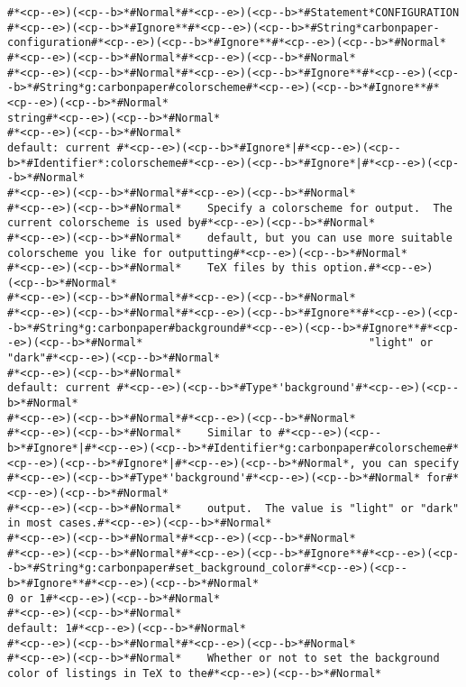 \begin{lstlisting}[style=carbonpaper]
#*<cp--e>)(<cp--b>*#Normal*#*<cp--e>)(<cp--b>*#Statement*CONFIGURATION                                      #*<cp--e>)(<cp--b>*#Ignore**#*<cp--e>)(<cp--b>*#String*carbonpaper-configuration#*<cp--e>)(<cp--b>*#Ignore**#*<cp--e>)(<cp--b>*#Normal*
#*<cp--e>)(<cp--b>*#Normal*#*<cp--e>)(<cp--b>*#Normal*
#*<cp--e>)(<cp--b>*#Normal*#*<cp--e>)(<cp--b>*#Ignore**#*<cp--e>)(<cp--b>*#String*g:carbonpaper#colorscheme#*<cp--e>)(<cp--b>*#Ignore**#*<cp--e>)(<cp--b>*#Normal*                                             string#*<cp--e>)(<cp--b>*#Normal*
#*<cp--e>)(<cp--b>*#Normal*                                               default: current #*<cp--e>)(<cp--b>*#Ignore*|#*<cp--e>)(<cp--b>*#Identifier*:colorscheme#*<cp--e>)(<cp--b>*#Ignore*|#*<cp--e>)(<cp--b>*#Normal*
#*<cp--e>)(<cp--b>*#Normal*#*<cp--e>)(<cp--b>*#Normal*
#*<cp--e>)(<cp--b>*#Normal*    Specify a colorscheme for output.  The current colorscheme is used by#*<cp--e>)(<cp--b>*#Normal*
#*<cp--e>)(<cp--b>*#Normal*    default, but you can use more suitable colorscheme you like for outputting#*<cp--e>)(<cp--b>*#Normal*
#*<cp--e>)(<cp--b>*#Normal*    TeX files by this option.#*<cp--e>)(<cp--b>*#Normal*
#*<cp--e>)(<cp--b>*#Normal*#*<cp--e>)(<cp--b>*#Normal*
#*<cp--e>)(<cp--b>*#Normal*#*<cp--e>)(<cp--b>*#Ignore**#*<cp--e>)(<cp--b>*#String*g:carbonpaper#background#*<cp--e>)(<cp--b>*#Ignore**#*<cp--e>)(<cp--b>*#Normal*                                   "light" or "dark"#*<cp--e>)(<cp--b>*#Normal*
#*<cp--e>)(<cp--b>*#Normal*                                               default: current #*<cp--e>)(<cp--b>*#Type*'background'#*<cp--e>)(<cp--b>*#Normal*
#*<cp--e>)(<cp--b>*#Normal*#*<cp--e>)(<cp--b>*#Normal*
#*<cp--e>)(<cp--b>*#Normal*    Similar to #*<cp--e>)(<cp--b>*#Ignore*|#*<cp--e>)(<cp--b>*#Identifier*g:carbonpaper#colorscheme#*<cp--e>)(<cp--b>*#Ignore*|#*<cp--e>)(<cp--b>*#Normal*, you can specify #*<cp--e>)(<cp--b>*#Type*'background'#*<cp--e>)(<cp--b>*#Normal* for#*<cp--e>)(<cp--b>*#Normal*
#*<cp--e>)(<cp--b>*#Normal*    output.  The value is "light" or "dark" in most cases.#*<cp--e>)(<cp--b>*#Normal*
#*<cp--e>)(<cp--b>*#Normal*#*<cp--e>)(<cp--b>*#Normal*
#*<cp--e>)(<cp--b>*#Normal*#*<cp--e>)(<cp--b>*#Ignore**#*<cp--e>)(<cp--b>*#String*g:carbonpaper#set_background_color#*<cp--e>)(<cp--b>*#Ignore**#*<cp--e>)(<cp--b>*#Normal*                                    0 or 1#*<cp--e>)(<cp--b>*#Normal*
#*<cp--e>)(<cp--b>*#Normal*                                                                  default: 1#*<cp--e>)(<cp--b>*#Normal*
#*<cp--e>)(<cp--b>*#Normal*#*<cp--e>)(<cp--b>*#Normal*
#*<cp--e>)(<cp--b>*#Normal*    Whether or not to set the background color of listings in TeX to the#*<cp--e>)(<cp--b>*#Normal*

\end{lstlisting}
